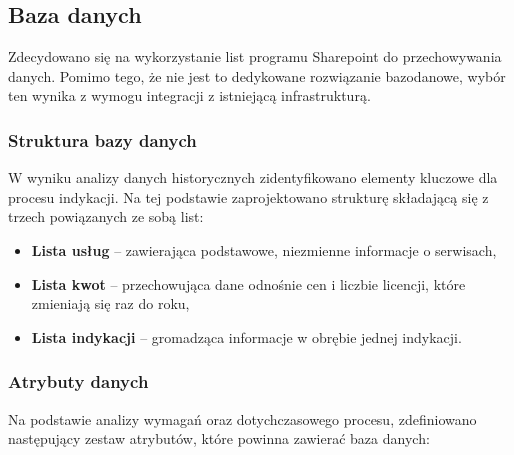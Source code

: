 \subsection{Baza danych}

Zdecydowano się na wykorzystanie list programu Sharepoint do przechowywania danych. Pomimo tego, że nie jest to dedykowane rozwiązanie bazodanowe, wybór ten wynika z wymogu integracji z istniejącą infrastrukturą.

\subsubsection*{Struktura bazy danych}
\label{Subsec: StrukturaBazyDanych}
\label{instruction-link}
W wyniku analizy danych historycznych zidentyfikowano elementy kluczowe dla procesu indykacji. Na tej podstawie zaprojektowano strukturę składającą się z trzech powiązanych ze sobą list:

\begin{itemize}
  \item \textbf{Lista usług} -- zawierająca podstawowe, niezmienne informacje o serwisach,
  \item \textbf{Lista kwot} -- przechowująca dane odnośnie cen i liczbie licencji, które zmieniają się raz do roku,
  \item \textbf{Lista indykacji} -- gromadząca informacje w obrębie jednej indykacji.
\end{itemize}
\subsubsection*{Atrybuty danych}
Na podstawie analizy wymagań oraz dotychczasowego procesu, zdefiniowano następujący zestaw atrybutów, które powinna zawierać baza danych:

